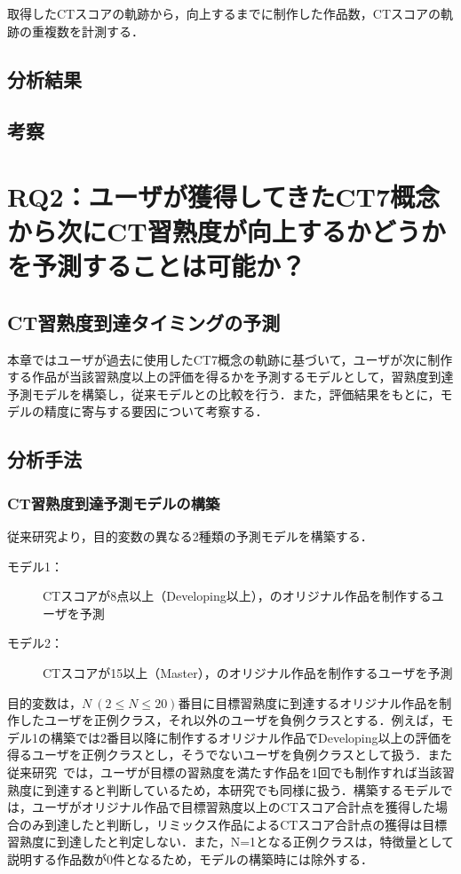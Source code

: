 \documentclass[11pt,dvipdfmx]{jreport}
\begin{document}
取得したCTスコアの軌跡から，向上するまでに制作した作品数，CTスコアの軌跡の重複数を計測する．
\section{分析結果}
\section{考察}

\chapter{RQ2：ユーザが獲得してきたCT7概念から次にCT習熟度が向上するかどうかを予測することは可能か？}
\section{CT習熟度到達タイミングの予測}
本章ではユーザが過去に使用したCT7概念の軌跡に基づいて，ユーザが次に制作する作品が当該習熟度以上の評価を得るかを予測するモデルとして，習熟度到達予測モデルを構築し，従来モデルとの比較を行う．また，評価結果をもとに，モデルの精度に寄与する要因について考察する．
\section{分析手法}
\subsection{CT習熟度到達予測モデルの構築}
従来研究より，目的変数の異なる2種類の予測モデルを構築する．

\begin{description}
\item [モデル1：]CTスコアが8点以上（Developing以上），のオリジナル作品を制作するユーザを予測
\item [モデル2：]CTスコアが15以上（Master），のオリジナル作品を制作するユーザを予測
\end{description}

目的変数は，{$N~(2 \leq N \leq 20)$}番目に目標習熟度に到達するオリジナル作品を制作したユーザを正例クラス，それ以外のユーザを負例クラスとする．例えば，モデル1の構築では2番目以降に制作するオリジナル作品でDeveloping以上の評価を得るユーザを正例クラスとし，そうでないユーザを負例クラスとして扱う．また従来研究~\cite{Ando_2021}では，ユーザが目標の習熟度を満たす作品を1回でも制作すれば当該習熟度に到達すると判断しているため，本研究でも同様に扱う．構築するモデルでは，ユーザがオリジナル作品で目標習熟度以上のCTスコア合計点を獲得した場合のみ到達したと判断し，リミックス作品によるCTスコア合計点の獲得は目標習熟度に到達したと判定しない．また，N=1となる正例クラスは，特徴量として説明する作品数が0件となるため，モデルの構築時には除外する．
\end{document}
